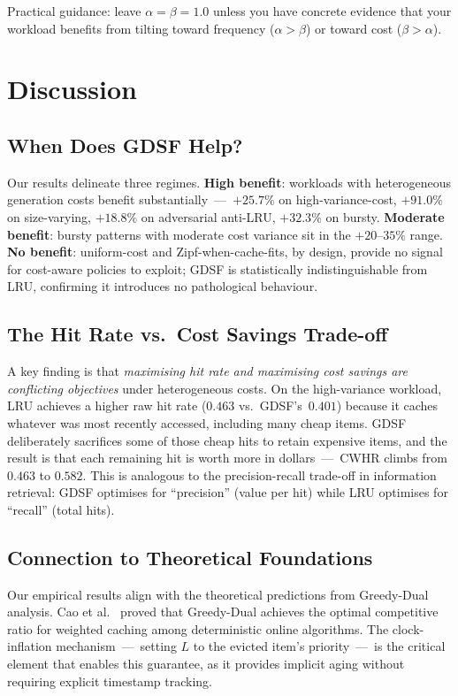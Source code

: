 \documentclass[sigconf, nonacm, review=false, screen=true]{acmart}
\begin{document}
Practical guidance: leave $\alpha = \beta = 1.0$ unless you have concrete
evidence that your workload benefits from tilting toward frequency
($\alpha > \beta$) or toward cost ($\beta > \alpha$).

\section{Discussion}
\label{sec:discuss}

\subsection{When Does GDSF Help?}
Our results delineate three regimes.
\textbf{High benefit}: workloads with heterogeneous generation costs
benefit substantially~---~$+25.7\%$ on high-variance-cost, $+91.0\%$ on
size-varying, $+18.8\%$ on adversarial anti-LRU, $+32.3\%$ on bursty.
\textbf{Moderate benefit}: bursty patterns with moderate cost variance
sit in the $+20$--$35\%$ range. \textbf{No benefit}: uniform-cost and
Zipf-when-cache-fits, by design, provide no signal for cost-aware
policies to exploit; GDSF is statistically indistinguishable from LRU,
confirming it introduces no pathological behaviour.

\subsection{The Hit Rate vs.\ Cost Savings Trade-off}
A key finding is that \emph{maximising hit rate and maximising cost
savings are conflicting objectives} under heterogeneous costs. On the
high-variance workload, LRU achieves a higher raw hit rate ($0.463$ vs.\
GDSF's~$0.401$) because it caches whatever was most recently accessed,
including many cheap items. GDSF deliberately sacrifices some of those
cheap hits to retain expensive items, and the result is that each
remaining hit is worth more in dollars~---~CWHR climbs from $0.463$ to
$0.582$. This is analogous to the precision-recall trade-off in
information retrieval: GDSF optimises for ``precision'' (value per hit)
while LRU optimises for ``recall'' (total hits).

\subsection{Connection to Theoretical Foundations}
Our empirical results align with the theoretical predictions from
Greedy-Dual analysis. Cao et al.~\cite{cao1997costaware} proved that
Greedy-Dual achieves the optimal competitive ratio for weighted caching
among deterministic online algorithms. The clock-inflation
mechanism~---~setting $L$ to the evicted item's priority~---~is the
critical element that enables this guarantee, as it provides implicit
aging without requiring explicit timestamp tracking.
\end{document}
